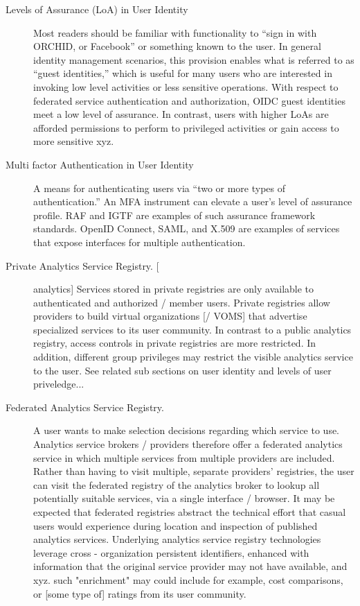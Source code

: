 \documentclass[12pt]{article}
\begin{document}
\begin{description}

\item[Levels of Assurance (LoA) in User Identity] Most readers should be familiar with functionality to “sign in with ORCHID, or Facebook” or something known to the user. In general identity management scenarios, this provision enables what is referred to as “guest identities,” which is useful for many users who are interested in invoking low level activities or less sensitive operations. With respect to federated service authentication and authorization, OIDC guest identities meet a low level of assurance. In contrast, users with higher LoAs are afforded permissions to perform to privileged activities or gain access to more sensitive xyz. 

\item[Multi factor Authentication in User Identity] A means for authenticating users via “two or more types of authentication.” An MFA instrument can elevate a user’s level of assurance profile. RAF and IGTF are examples of such assurance framework standards.  OpenID Connect, SAML, and X.509 are examples of services that expose interfaces for multiple authentication. 

\item[Private Analytics Service Registry. []analytics] Services stored in private registries are only available to authenticated and authorized / member users. Private registries allow providers to build virtual organizations [/ VOMS] that advertise specialized services to its user community. In contrast to a public analytics registry, access controls in private registries are more restricted. In addition, different group privileges may restrict the visible analytics service to the user. See related sub sections on user identity and levels of user priveledge... 

\item[Federated Analytics Service Registry.] A user wants to make selection decisions regarding which service to use. Analytics service brokers / providers therefore offer a federated analytics service in which multiple services from multiple providers are included. Rather than having to visit multiple, separate providers' registries, the user can visit the federated registry of the analytics broker to lookup all potentially suitable services, via a single interface / browser. It may be expected that federated registries abstract the technical effort that casual users would experience during location and inspection of published analytics services. 
Underlying analytics service registry technologies leverage cross - organization persistent identifiers, enhanced with information that the original service provider may not have available, and xyz. such "enrichment" may could include for example, cost comparisons, or [some type of] ratings from its user community.


\end{description}
\end{document}
